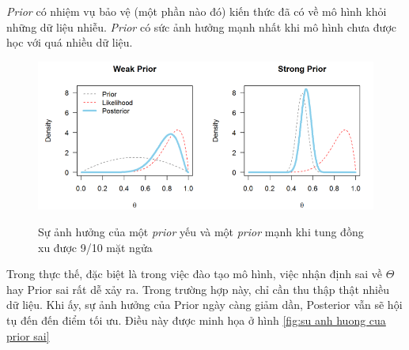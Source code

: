 \textit{Prior} có nhiệm vụ bảo vệ (một phần nào đó) kiến thức đã có về mô hình khỏi những dữ liệu nhiễu. \textit{Prior} có sức ảnh hưởng mạnh nhất khi mô hình chưa được học với quá nhiều dữ liệu.
\begin{figure}[h]
	\begin{center}
		\includegraphics[height=.25\textheight]{Chuong3/Figs/prior.png}
		\label{fig:su anh huong cua prior}
		\caption{Sự ảnh hưởng của một \textit{prior} yếu và một \textit{prior} mạnh khi tung đồng xu được 9/10 mặt ngửa}
	\end{center}
\end{figure}
Trong thực thế, đặc biệt là trong việc đào tạo mô hình, việc nhận định sai về $\Theta$ hay Prior sai rất dễ xảy ra. Trong trường hợp này, chỉ cần thu thập thật nhiều dữ liệu. Khi ấy, sự ảnh hưởng của Prior ngày càng giảm dần, Posterior vẫn sẽ hội tụ đến đến điểm tối ưu. Điều này được minh họa ở hình \ref{fig:su anh huong cua prior sai}
